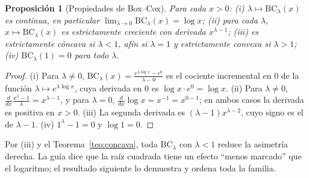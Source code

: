 \documentclass[11pt]{article}
\newtheorem{proposicion}[teorema]{Proposición}
\theoremstyle{definition}
\theoremstyle{remark}
\newcommand{\BC}{\mathrm{BC}}
\begin{document}
\begin{proposicion}[Propiedades de Box--Cox]\label{prop:bc-prop}
\noindent Para cada $x>0$: (i) $\lambda\mapsto\BC_\lambda(x)$ es continua, en particular $\lim_{\lambda\to0}\BC_\lambda(x)=\log x$; (ii) para cada $\lambda$, $x\mapsto\BC_\lambda(x)$ es estrictamente creciente con derivada $x^{\lambda-1}$; (iii) es estrictamente cóncava si $\lambda<1$, afín si $\lambda=1$ y estrictamente convexa si $\lambda>1$; (iv) $\BC_\lambda(1)=0$ para todo $\lambda$.
\end{proposicion}
\begin{proof}
\noindent (i) Para $\lambda\ne0$, $\BC_\lambda(x)=\frac{e^{\lambda\log x}-e^{0}}{\lambda-0}$ es el cociente incremental en $0$ de la función $\lambda\mapsto e^{\lambda\log x}$, cuya derivada en $0$ es $\log x\cdot e^0=\log x$. (ii) Para $\lambda\ne0$, $\frac{d}{dx}\frac{x^\lambda-1}\lambda=x^{\lambda-1}$, y para $\lambda=0$, $\frac{d}{dx}\log x=x^{-1}=x^{0-1}$; en ambos casos la derivada es positiva en $x>0$. (iii) La segunda derivada es $(\lambda-1)x^{\lambda-2}$, cuyo signo es el de $\lambda-1$. (iv) $1^\lambda-1=0$ y $\log1=0$.
\end{proof}

\noindent Por (iii) y el Teorema~\ref{teo:concava}, toda $\BC_\lambda$ con $\lambda<1$ reduce la asimetría derecha. La guía dice que la raíz cuadrada tiene un efecto ``menos marcado'' que el logaritmo; el resultado siguiente lo demuestra y ordena toda la familia.
\end{document}
